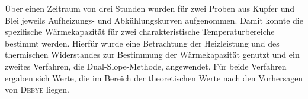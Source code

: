 \documentclass[parskip=half, a4paper,twoside,final]{article}
\begin{document}
Über einen Zeitraum von drei Stunden wurden für zwei Proben aus Kupfer und Blei jeweils Aufheizungs- und Abkühlungskurven aufgenommen. Damit konnte die spezifische Wärmekapazität für zwei charakteristische Temperaturbereiche bestimmt werden. Hierfür wurde eine Betrachtung der Heizleistung und des thermischen Widerstandes zur Bestimmung der Wärmekapazität genutzt und ein zweites Verfahren, die Dual-Slope-Methode, angewendet. Für beide Verfahren ergaben sich Werte, die im Bereich der theoretischen Werte nach den Vorhersagen von \textsc{Debye} liegen.
\newpage
{}

\end{document}
